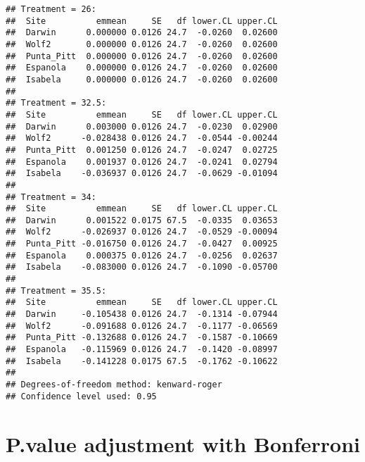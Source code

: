 \documentclass[
]{article}
\newenvironment{Shaded}{\begin{snugshade}}{\end{snugshade}}
\newcommand{\AttributeTok}[1]{\textcolor[rgb]{0.77,0.63,0.00}{#1}}
\newcommand{\FunctionTok}[1]{\textcolor[rgb]{0.00,0.00,0.00}{#1}}
\newcommand{\NormalTok}[1]{#1}
\newcommand{\SpecialCharTok}[1]{\textcolor[rgb]{0.00,0.00,0.00}{#1}}
\newcommand{\StringTok}[1]{\textcolor[rgb]{0.31,0.60,0.02}{#1}}
\begin{document}
\begin{verbatim}
## Treatment = 26:
##  Site          emmean     SE   df lower.CL upper.CL
##  Darwin      0.000000 0.0126 24.7  -0.0260  0.02600
##  Wolf2       0.000000 0.0126 24.7  -0.0260  0.02600
##  Punta_Pitt  0.000000 0.0126 24.7  -0.0260  0.02600
##  Espanola    0.000000 0.0126 24.7  -0.0260  0.02600
##  Isabela     0.000000 0.0126 24.7  -0.0260  0.02600
## 
## Treatment = 32.5:
##  Site          emmean     SE   df lower.CL upper.CL
##  Darwin      0.003000 0.0126 24.7  -0.0230  0.02900
##  Wolf2      -0.028438 0.0126 24.7  -0.0544 -0.00244
##  Punta_Pitt  0.001250 0.0126 24.7  -0.0247  0.02725
##  Espanola    0.001937 0.0126 24.7  -0.0241  0.02794
##  Isabela    -0.036937 0.0126 24.7  -0.0629 -0.01094
## 
## Treatment = 34:
##  Site          emmean     SE   df lower.CL upper.CL
##  Darwin      0.001522 0.0175 67.5  -0.0335  0.03653
##  Wolf2      -0.026937 0.0126 24.7  -0.0529 -0.00094
##  Punta_Pitt -0.016750 0.0126 24.7  -0.0427  0.00925
##  Espanola    0.000375 0.0126 24.7  -0.0256  0.02637
##  Isabela    -0.083000 0.0126 24.7  -0.1090 -0.05700
## 
## Treatment = 35.5:
##  Site          emmean     SE   df lower.CL upper.CL
##  Darwin     -0.105438 0.0126 24.7  -0.1314 -0.07944
##  Wolf2      -0.091688 0.0126 24.7  -0.1177 -0.06569
##  Punta_Pitt -0.132688 0.0126 24.7  -0.1587 -0.10669
##  Espanola   -0.115969 0.0126 24.7  -0.1420 -0.08997
##  Isabela    -0.141228 0.0175 67.5  -0.1762 -0.10622
## 
## Degrees-of-freedom method: kenward-roger 
## Confidence level used: 0.95
\end{verbatim}

\hypertarget{p.value-adjustment-with-bonferroni}{%
\section{P.value adjustment with
Bonferroni}\label{p.value-adjustment-with-bonferroni}}

\begin{Shaded}
\end{Shaded}
\end{document}
